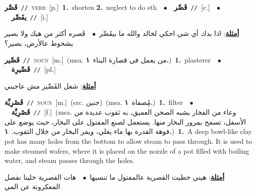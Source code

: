 \documentclass[10pt,a4paper,twoside]{article} %
\begin{document}
\begin{multicols}{2}
{\setlength\topsep{0pt}\textbf{\foreignlanguage{arabic}{قَصَّر}}\ {\color{gray}\texttt{//}\color{black}}\ \textsc{verb}\ [p.]\ \textbf{1.}~shorten  \textbf{2.}~neglect to do sth\ \ $\bullet$\ \ \setlength\topsep{0pt}\textbf{\foreignlanguage{arabic}{قَصِّر}}\ {\color{gray}\texttt{//}\color{black}}\ [c.]\ \ $\bullet$\ \ \setlength\topsep{0pt}\textbf{\foreignlanguage{arabic}{يقَصِّر}}\ {\color{gray}\texttt{//}\color{black}}\ [i.]\  \begin{flushright}\color{gray}\foreignlanguage{arabic}{\textbf{\underline{\foreignlanguage{arabic}{أمثلة}}}: اذا بدك أي شي احكي لخالد والله ما بيقَصِّر\ $\bullet$\ \  قَصره أكثر من هيك ولا بصير يشحوط عالأرض، بصير؟}\end{flushright}\color{black}} \vspace{2mm}

{\setlength\topsep{0pt}\textbf{\foreignlanguage{arabic}{قَصِّير}}\ {\color{gray}\texttt{//}\color{black}}\ \textsc{noun}\ [m.]\ \color{gray}(msa. \foreignlanguage{arabic}{من يعمل في قصارة البناء}~\foreignlanguage{arabic}{\textbf{١.}})\color{black}\ \textbf{1.}~plasterer\ \ $\bullet$\ \ \setlength\topsep{0pt}\textbf{\foreignlanguage{arabic}{قَصِّيرِة}}\ {\color{gray}\texttt{//}\color{black}}\ [pl.]\  \begin{flushright}\color{gray}\foreignlanguage{arabic}{\textbf{\underline{\foreignlanguage{arabic}{أمثلة}}}: شغل القَصِّير مش عاجبني}\end{flushright}\color{black}} \vspace{2mm}

{\setlength\topsep{0pt}\textbf{\foreignlanguage{arabic}{قَصْرِيِّة}}\ {\color{gray}\texttt{//}\color{black}}\ \textsc{noun}\ [m.]\ (src. \color{gray}\foreignlanguage{arabic}{جنين}\color{black})\ \color{gray}(msa. \foreignlanguage{arabic}{مُِصفاة}~\foreignlanguage{arabic}{\textbf{١.}})\color{black}\ \textbf{1.}~filter\ \ $\bullet$\ \ \setlength\topsep{0pt}\textbf{\foreignlanguage{arabic}{قَصْرِيِّة}}\ {\color{gray}\texttt{//}\color{black}}\ [f.]\ \color{gray}(msa. \foreignlanguage{arabic}{وعاء من الفخار يشبه الصحن العميق، به ثقوب عديدة من الأسفل، تسمح بمرور البخار منها. يستعمل لصنع المفتول على البخار، حيث يوضع على فوهة القدرة بها ماء يغلي، ويمر البخار من خلال الثقوب.}~\foreignlanguage{arabic}{\textbf{١.}})\color{black}\ \textbf{1.}~A deep bowl-like clay pot has many holes from the bottom to allow steam to pass through. It is used to make steamed wafers, where it is placed on the nozzle of a pot filled with boiling water, and steam passes through the holes.\  \begin{flushright}\color{gray}\foreignlanguage{arabic}{\textbf{\underline{\foreignlanguage{arabic}{أمثلة}}}: هيني حطيت القصرية عالمفتول ما تنسيها\ $\bullet$\ \  هات القصرية خلينا نفصل المعكرونة عن المي}\end{flushright}\color{black}} \vspace{2mm}


\end{multicols}
\end{document}
